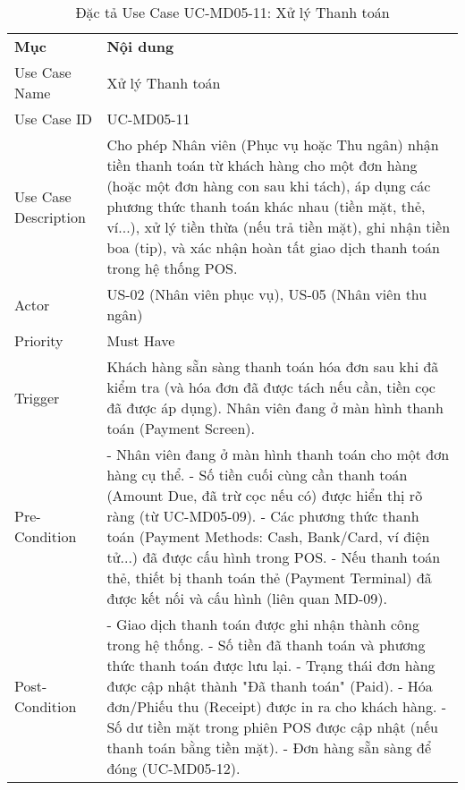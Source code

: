\begin{longtable}{|m{4cm}|p{11cm}|}
\caption{Đặc tả Use Case UC-MD05-11: Xử lý Thanh toán} \label{tab:uc_md05_11} \\
\hline

\endhead %
\hline
\endfoot %
\hline
\endlastfoot %
\multicolumn{2}{|c|}{\textbf{2.1. Tóm tắt (Summary)}} \\
\hline
\textbf{Mục} & \textbf{Nội dung} \\
\hline
Use Case Name & Xử lý Thanh toán \\
\hline
Use Case ID & UC-MD05-11 \\
\hline
Use Case Description & Cho phép Nhân viên (Phục vụ hoặc Thu ngân) nhận tiền thanh toán từ khách hàng cho một đơn hàng (hoặc một đơn hàng con sau khi tách), áp dụng các phương thức thanh toán khác nhau (tiền mặt, thẻ, ví...), xử lý tiền thừa (nếu trả tiền mặt), ghi nhận tiền boa (tip), và xác nhận hoàn tất giao dịch thanh toán trong hệ thống POS. \\
\hline
Actor & US-02 (Nhân viên phục vụ), US-05 (Nhân viên thu ngân) \\
\hline
Priority & Must Have \\
\hline
Trigger & Khách hàng sẵn sàng thanh toán hóa đơn sau khi đã kiểm tra (và hóa đơn đã được tách nếu cần, tiền cọc đã được áp dụng). Nhân viên đang ở màn hình thanh toán (Payment Screen). \\
\hline
Pre-Condition & - Nhân viên đang ở màn hình thanh toán cho một đơn hàng cụ thể. \newline - Số tiền cuối cùng cần thanh toán (Amount Due, đã trừ cọc nếu có) được hiển thị rõ ràng (từ UC-MD05-09). \newline - Các phương thức thanh toán (Payment Methods: Cash, Bank/Card, ví điện tử...) đã được cấu hình trong POS. \newline - Nếu thanh toán thẻ, thiết bị thanh toán thẻ (Payment Terminal) đã được kết nối và cấu hình (liên quan MD-09). \\
\hline
Post-Condition & - Giao dịch thanh toán được ghi nhận thành công trong hệ thống. \newline - Số tiền đã thanh toán và phương thức thanh toán được lưu lại. \newline - Trạng thái đơn hàng được cập nhật thành "Đã thanh toán" (Paid). \newline - Hóa đơn/Phiếu thu (Receipt) được in ra cho khách hàng. \newline - Số dư tiền mặt trong phiên POS được cập nhật (nếu thanh toán bằng tiền mặt). \newline - Đơn hàng sẵn sàng để đóng (UC-MD05-12). \\

\end{longtable}
